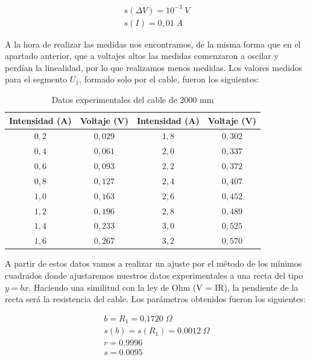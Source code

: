 \documentclass[a4paper,12pt,titlepage]{report}
\begin{document}
\begin{equation}
    \begin{gathered}
        s(\Delta V) = 10^{-3} \; V \\
        s(I) = 0,01\; A
    \end{gathered}
\end{equation}

A la hora de realizar las medidas nos encontramos, de la misma forma que en el apartado anterior, que a voltajes altos las medidas comenzaron a oscilar y perdían la linealidad, por lo que realizamos menos medidas. Los valores medidos para el segmento $U_{1}$, formado solo por el cable, fueron los siguientes:

\begin{table}[h!]
    \centering
    \begin{tabular}{|c|c|c|c|}
        \hline
        Intensidad (A) & Voltaje (V) & Intensidad (A) & Voltaje (V) \\ \hline
        $0,2$ & $0,029$ & $1,8$ & $0,302$ \\ \hline
        $0,4$ & $0,061$ & $2,0$ & $0,337$ \\ \hline
        $0,6$ & $0,093$ & $2,2$ & $0,372$ \\ \hline
        $0,8$ & $0,127$ & $2,4$ & $0,407$ \\ \hline
        $1,0$ & $0,163$ & $2,6$ & $0,452$ \\ \hline
        $1,2$ & $0,196$ & $2,8$ & $0,489$ \\ \hline
        $1,4$ & $0,233$ & $3,0$ & $0,525$ \\ \hline
        $1,6$ & $0,267$ & $3,2$ & $0,570$ \\ \hline
    \end{tabular}
    \caption{Datos experimentales del cable de 2000 mm}
\end{table}

A partir de estos datos vamos a realizar un ajuste por el método de los mínimos cuadrados donde ajustaremos nuestros datos experimentales a una recta del tipo $y = bx$. Haciendo una similitud con la ley de Ohm (V = IR), la pendiente de la recta será la resistencia del cable. Los parámetros obtenidos fueron los siguientes:

\begin{equation}
    \begin{gathered}
        b = R_{1} = 0.1720 \; \Omega \\
        s(b) = s(R_{1}) = 0.0012\; \Omega \\
        r =  0.9996 \\
        s =  0.0095
    \end{gathered}
\end{equation}
\end{document}

